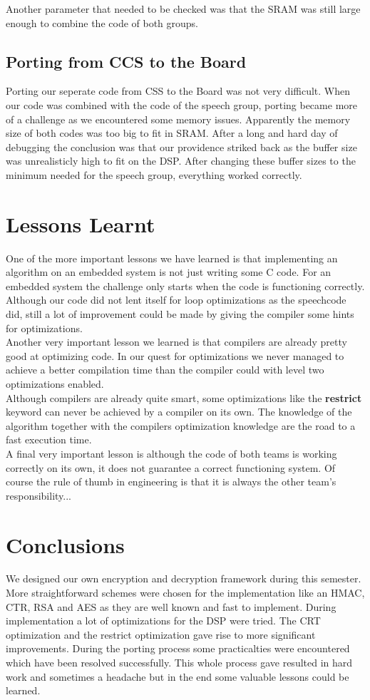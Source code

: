 \documentclass[a4paper]{article}
\begin{document}
Another parameter that needed to be checked was that the SRAM was still large enough to combine the code of both groups.

\subsection{Porting from CCS to the Board}
Porting our seperate code from CSS to the Board was not very difficult. When our code was combined with the code of the speech group, porting became more of a challenge as we encountered some memory issues. Apparently the memory size of both codes was too big to fit in SRAM. After a long and hard day of debugging the conclusion was that our providence striked back as the buffer size was unrealisticly high to fit on the DSP. After changing these buffer sizes to the minimum needed for the speech group, everything worked correctly.

\section{Lessons Learnt}
One of the more important lessons we have learned is that implementing an algorithm on an embedded system is not just writing some C code. For an embedded system the challenge only starts when the code is functioning correctly. Although our code did not lent itself for loop optimizations as the speechcode did, still a lot of improvement could be made by giving the compiler some hints for optimizations.\\

Another very important lesson we learned is that compilers are already pretty good at optimizing code. In our quest for optimizations we never managed to achieve a better compilation time than the compiler could with level two optimizations enabled. \\

Although compilers are already quite smart, some optimizations like the \textbf{restrict} keyword can never be achieved by a compiler on its own. The knowledge of the algorithm together with the compilers optimization knowledge are the road to a fast execution time.\\

A final very important lesson is although the code of both teams is working correctly on its own, it does not guarantee a correct functioning system. Of course the rule of thumb in engineering is that it is always the other team's responsibility...

\section{Conclusions}
We designed our own encryption and decryption framework during this semester. More straightforward schemes were chosen for the implementation like an HMAC, CTR, RSA and AES as they are well known and fast to implement. During implementation a lot of optimizations for the DSP were tried. The CRT optimization and the restrict optimization gave rise to more significant improvements. During the porting process some practicalties were encountered which have been resolved successfully. This whole process gave resulted in hard work and sometimes a headache but in the end some valuable lessons could be learned.
\end{document}
